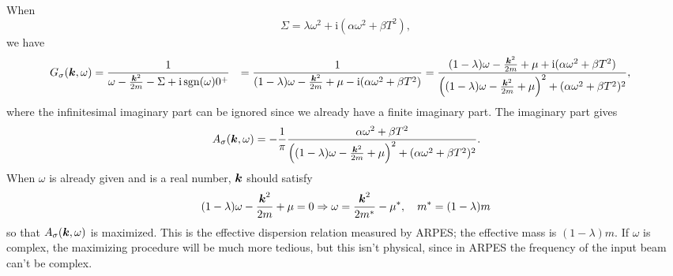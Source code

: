 \documentclass[hyperref, a4paper]{article}
\DeclareMathOperator{\sgn}{sgn}
\newcommand*{\ii}{\mathrm{i}}
\def\\{}%
\begin{document}
When 
\begin{equation}
    \Sigma = \lambda \omega^2 + \ii (\alpha \omega^2 + \beta T^2),
\end{equation}
we have 
\begin{equation}
    \begin{aligned}
        G_\sigma(\vb*{k}, \omega)
        &= \frac{1}{\omega - \frac{\vb*{k}^2}{2m} - \Sigma + \ii \sgn(\omega) 0^+} \\
        &= \frac{1}{(1 - \lambda) \omega - \frac{\vb*{k}^2}{2m} + \mu - \ii (\alpha \omega^2 + \beta T^2)} \\
        &= \frac{(1 - \lambda) \omega - \frac{\vb*{k}^2}{2m} + \mu + \ii (\alpha \omega^2 + \beta T^2)}{
            \left(
                (1 - \lambda) \omega - \frac{\vb*{k}^2}{2m} + \mu
            \right)^2
            + (\alpha \omega^2 + \beta T^2)^2
        },
    \end{aligned}
\end{equation}
where the infinitesimal imaginary part can be ignored 
since we already have a finite imaginary part.
The imaginary part gives 
\begin{equation}
    A_\sigma(\vb*{k}, \omega)
    = - \frac{1}{\pi} \frac{ \alpha \omega^2 + \beta T^2}{
        \left(
            (1 - \lambda) \omega - \frac{\vb*{k}^2}{2m} + \mu
        \right)^2
        + (\alpha \omega^2 + \beta T^2)^2
    }.
\end{equation}
When $\omega$ is already given and is a real number, 
$\vb*{k}$ should satisfy 
\begin{equation}
    (1 - \lambda) \omega - \frac{\vb*{k}^2}{2m} + \mu = 0 \Rightarrow
    \omega = \frac{\vb*{k}^2}{2m^*} - \mu^*, \quad 
    m^* = (1 - \lambda) m 
\end{equation}
so that $A_\sigma(\vb*{k}, \omega)$ is maximized.
This is the effective dispersion relation measured by ARPES;
the effective mass is $(1 - \lambda) m$.
If $\omega$ is complex, 
the maximizing procedure will be much more tedious, 
but this isn't physical, 
since in ARPES the frequency of the input beam can't be complex.
\end{document}
